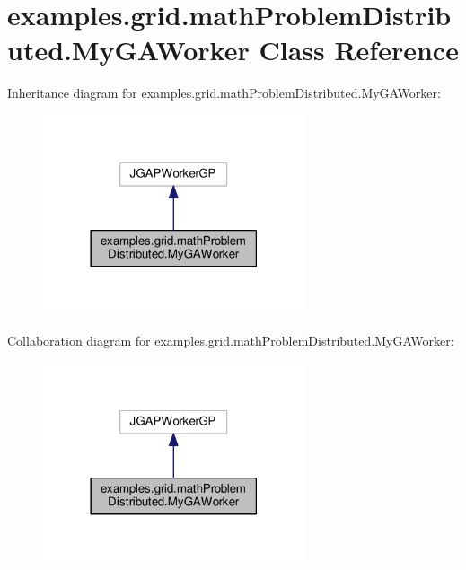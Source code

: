 \hypertarget{classexamples_1_1grid_1_1math_problem_distributed_1_1_my_g_a_worker}{\section{examples.\-grid.\-math\-Problem\-Distributed.\-My\-G\-A\-Worker Class Reference}
\label{classexamples_1_1grid_1_1math_problem_distributed_1_1_my_g_a_worker}
}


Inheritance diagram for examples.\-grid.\-math\-Problem\-Distributed.\-My\-G\-A\-Worker\-:
\nopagebreak
\begin{figure}[H]
\begin{center}
\leavevmode
\includegraphics[width=218pt]{classexamples_1_1grid_1_1math_problem_distributed_1_1_my_g_a_worker__inherit__graph}
\end{center}
\end{figure}


Collaboration diagram for examples.\-grid.\-math\-Problem\-Distributed.\-My\-G\-A\-Worker\-:
\nopagebreak
\begin{figure}[H]
\begin{center}
\leavevmode
\includegraphics[width=218pt]{classexamples_1_1grid_1_1math_problem_distributed_1_1_my_g_a_worker__coll__graph}
\end{center}
\end{figure}
